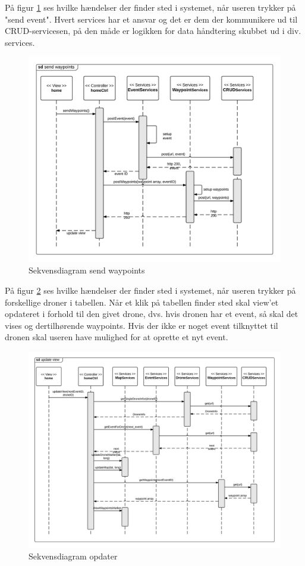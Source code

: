 \newpage
På figur \ref{fig:send_waypoints} ses hvilke hændelser der finder sted i systemet, når useren trykker på "send event". Hvert services har et ansvar og det er dem der kommunikere ud til CRUD-servicesen, på den måde er logikken for data håndtering skubbet ud i div. services. 
\begin{figure}[H]
	\centering
	\includegraphics[width=1\textwidth]{Billeder/sekvens/sd_send_waypoints.png}
	\caption{Sekvensdiagram send waypoints}
	\label{fig:send_waypoints}
\end{figure}

\newpage
På figur \ref{fig:update_view} ses hvilke hændelser der finder sted i systemet, når useren trykker på forskellige droner i tabellen. Når et klik på tabellen finder sted skal view'et opdateret i forhold til den givet drone, dvs. hvis dronen har et event, så skal det vises og dertilhørende waypoints. Hvis der ikke er noget event tilknyttet til dronen skal useren have mulighed for at oprette et nyt event.
\begin{figure}[H]
	\centering
	\includegraphics[width=1\textwidth]{Billeder/sekvens/sd_update_view.png}
	\caption{Sekvensdiagram opdater }
	\label{fig:update_view}
\end{figure}

